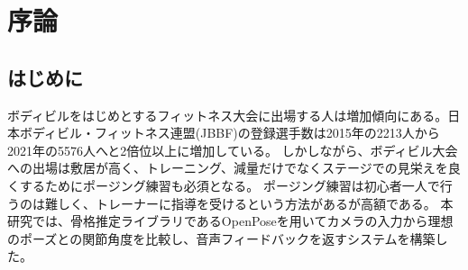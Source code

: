 \chapter{序論}
\label{introduction}

\section{はじめに}
\label{introduction:background}
ボディビルをはじめとするフィットネス大会に出場する人は増加傾向にある。日本ボディビル・フィットネス連盟(JBBF)の登録選手数は2015年の2213人から2021年の5576人へと2倍位以上に増加している\cite{jbbf}。
しかしながら、ボディビル大会への出場は敷居が高く、トレーニング、減量だけでなくステージでの見栄えを良くするためにポージング練習も必須となる。
ポージング練習は初心者一人で行うのは難しく、トレーナーに指導を受けるという方法があるが高額である。
本研究では、骨格推定ライブラリであるOpenPoseを用いてカメラの入力から理想のポーズとの関節角度を比較し、音声フィードバックを返すシステムを構築した。


\cite{fitness}





